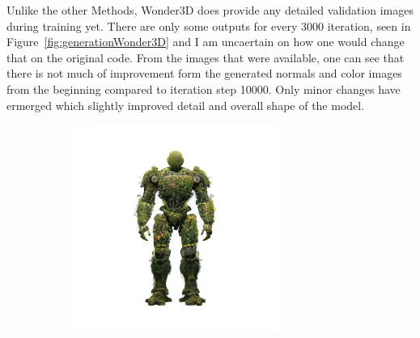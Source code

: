 Unlike the other Methods, Wonder3D does provide any detailed validation images during training yet. There are only some outputs for every 3000 iteration, seen in Figure~\ref{fig:generationWonder3D} and I am uncaertain on how one would change that on the original code. From the images that were available, one can see that there is not much of improvement  form the generated normals and color images from the beginning compared to iteration step 10000. Only minor changes have ermerged which slightly improved detail and overall shape of the model.

\begin{figure}[ht]
    \centering
    \begin{subfigure}[b]{0.18\textwidth}
        \centering
        \fontsize{9pt}{7pt}\selectfont{}
        \includegraphics[width=\textwidth]{etc/a robot made out of plants/wonder3d/rgb_000_front}

\end{subfigure}
\end{figure}
